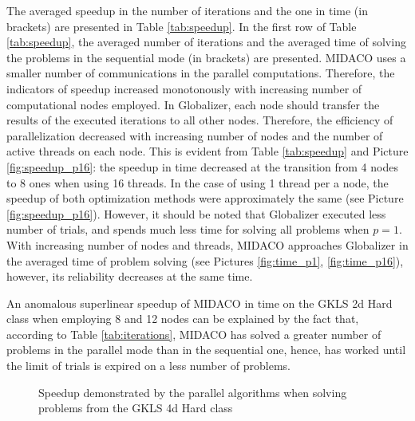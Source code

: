 \documentclass{svproc}
\begin{document}
The averaged speedup in the number of iterations and the one in time (in brackets) are presented in
Table \ref{tab:speedup}. In the first row of Table \ref{tab:speedup}, the averaged number of
iterations and the averaged time of solving the problems in the sequential mode (in brackets) are
presented. MIDACO uses a smaller number of communications in the parallel computations.
Therefore, the indicators of speedup increased monotonously with increasing number of
computational nodes employed. In Globalizer, each node should transfer the results of the executed
iterations to all other nodes. Therefore, the efficiency of parallelization decreased with increasing
number of nodes and the number of active threads on each node. This is evident from Table
\ref{tab:speedup} and Picture \ref{fig:speedup_p16}: the speedup in time decreased at the transition from 4 nodes to 8 ones when
using 16 threads. In the case of using 1 thread per a node, the speedup of both optimization methods
were approximately the same (see Picture \ref{fig:speedup_p16}). However, it should be noted that Globalizer executed less number of
trials, and spends much less time for solving all problems when \(p=1\). With increasing number of
nodes and threads, MIDACO approaches Globalizer in the averaged time of problem solving (see Pictures \ref{fig:time_p1}, \ref{fig:time_p16}),
however, its reliability decreases at the same time.

An anomalous superlinear speedup of MIDACO in time on the GKLS 2d Hard class when
employing 8 and 12 nodes can be explained by the fact that, according to Table \ref{tab:iterations},
MIDACO has solved a greater number of problems in the parallel mode than in the sequential one,
hence, has worked until the limit of trials is expired on a less number of problems.

\begin{figure}[ht]
  \centering
  \caption{Speedup demonstrated by the parallel algorithms when solving problems from the GKLS 4d Hard class}
\end{figure}
\end{document}
